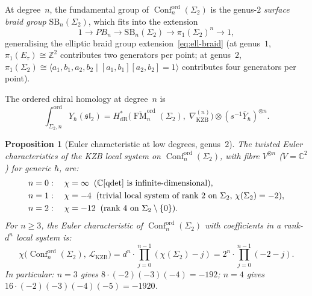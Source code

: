 \documentclass[11pt,reqno]{amsart}
\newtheorem{proposition}[theorem]{Proposition}
\theoremstyle{definition}
\theoremstyle{remark}
\newcommand{\cL}{\mathcal{L}}
\DeclareMathOperator{\Conf}{Conf}
\DeclareMathOperator{\FM}{FM}
\newcommand{\CC}{\mathbb{C}}
\newcommand{\ZZ}{\mathbb{Z}}
\numberwithin{equation}{section}
\begin{document}
At degree~$n$, the fundamental group of
$\Conf_n^{\mathrm{ord}}(\Sigma_2)$ is the genus-$2$
\emph{surface braid group} $\mathrm{SB}_n(\Sigma_2)$, which
fits into the extension
\begin{equation}\label{eq:surface-braid-g2}
  1 \to PB_n \to \mathrm{SB}_n(\Sigma_2) \to
  \pi_1(\Sigma_2)^n \to 1,
\end{equation}
generalising the elliptic braid group
extension~\eqref{eq:ell-braid} (at genus~$1$,
$\pi_1(E_\tau) \cong \ZZ^2$ contributes two generators
per point; at genus~$2$,
$\pi_1(\Sigma_2) \cong \langle a_1, b_1, a_2, b_2 \mid
[a_1, b_1][a_2, b_2] = 1\rangle$ contributes four
generators per point).

The ordered chiral homology at degree~$n$ is
\begin{equation}\label{eq:g2-degree-n}
  \int_{\Sigma_2, n}^{\mathrm{ord}}
  Y_\hbar(\mathfrak{sl}_2)
  = H^*_{\mathrm{dR}}\bigl(
  \overline{\FM}_n^{\mathrm{ord}}(\Sigma_2),\;
  \nabla_{\mathrm{KZB}}^{(n)}\bigr)
  \otimes (s^{-1}\bar{Y}_\hbar)^{\otimes n}.
\end{equation}

\begin{proposition}[Euler characteristic at low degrees,
genus~$2$]
\label{prop:g2-euler-n}
The twisted Euler characteristics of the KZB local system on
$\Conf_n^{\mathrm{ord}}(\Sigma_2)$, with fibre $V^{\otimes n}$
\textup{(}$V = \CC^2$\textup{)} for generic $\hbar$, are:
\begin{align}
  n = 0&: \quad \chi = \infty
  \;\;\text{\textup{(}$\CC[\operatorname{qdet}]$ is
  infinite-dimensional\textup{)}},
  \label{eq:g2-euler-n0} \\
  n = 1&: \quad \chi = -4
  \;\;\text{\textup{(}trivial local system of rank $2$
  on $\Sigma_2$,
  $\chi(\Sigma_2) = -2$\textup{)}},
  \label{eq:g2-euler-n1} \\
  n = 2&: \quad \chi = -12
  \;\;\text{\textup{(}rank $4$ on $\Sigma_2 \setminus
  \{0\}$\textup{)}}.
  \label{eq:g2-euler-n2}
\end{align}
For $n \geq 3$, the Euler characteristic of
$\Conf_n^{\mathrm{ord}}(\Sigma_2)$ with coefficients in a
rank-$d^n$ local system is:
\begin{equation}\label{eq:g2-euler-general}
  \chi\bigl(\Conf_n^{\mathrm{ord}}(\Sigma_2),\,
  \cL_{\mathrm{KZB}}\bigr)
  = d^n \cdot \prod_{j=0}^{n-1}(\chi(\Sigma_2) - j)
  = 2^n \cdot \prod_{j=0}^{n-1}(-2 - j).
\end{equation}
In particular: $n = 3$ gives
$8 \cdot (-2)(-3)(-4) = -192$;
$n = 4$ gives $16 \cdot (-2)(-3)(-4)(-5) = -1920$.
\end{proposition}
\end{document}
